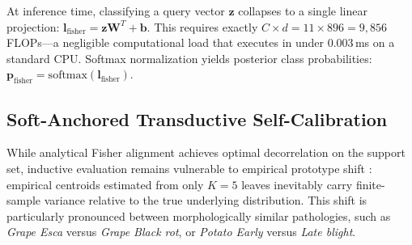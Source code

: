 \documentclass[conference]{IEEEtran}
\begin{document}
At inference time, classifying a query vector $\mathbf{z}$ collapses to a single linear projection: $\mathbf{l}_{\text{fisher}} = \mathbf{z} \mathbf{W}^T + \mathbf{b}$. This requires exactly $C \times d = 11 \times 896 = 9,856$ FLOPs---a negligible computational load that executes in under $0.003$\,ms on a standard CPU. Softmax normalization yields posterior class probabilities: $\mathbf{p}_{\text{fisher}} = \text{softmax}(\mathbf{l}_{\text{fisher}})$.

\subsection{Soft-Anchored Transductive Self-Calibration}
\label{sec:transductive}

While analytical Fisher alignment achieves optimal decorrelation on the support set, inductive evaluation remains vulnerable to empirical prototype shift \cite{boudiaf2020transductive}: empirical centroids estimated from only $K=5$ leaves inevitably carry finite-sample variance relative to the true underlying distribution. This shift is particularly pronounced between morphologically similar pathologies, such as \textit{Grape Esca} versus \textit{Grape Black rot}, or \textit{Potato Early} versus \textit{Late blight}.
\end{document}
